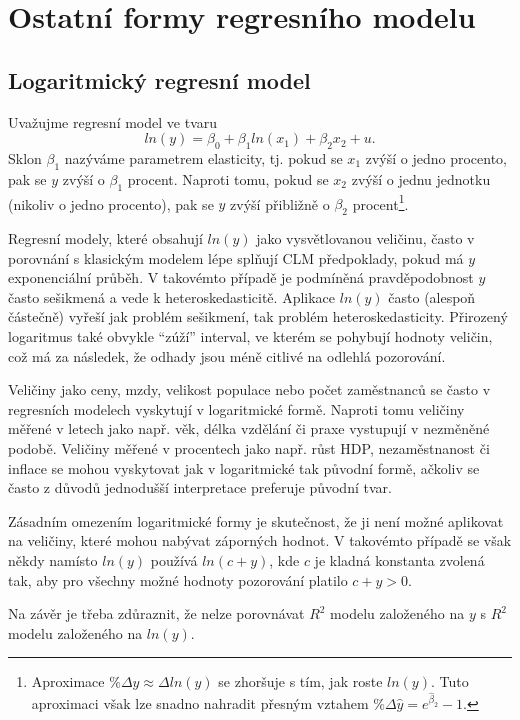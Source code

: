 \section{Ostatní formy regresního modelu}

\subsection{Logaritmický regresní model}

Uvažujme regresní model ve tvaru
\begin{equation}
ln(y) = \beta_0 + \beta_1 ln(x_1) + \beta_2 x_2 + u.
\end{equation}
Sklon $\beta_1$ nazýváme parametrem elasticity, tj. pokud se $x_1$ zvýší o jedno procento, pak se $y$ zvýší o $\beta_1$ procent. Naproti 
tomu, pokud se $x_2$ zvýší o jednu jednotku (nikoliv o jedno procento), pak se $y$ zvýší přibližně o $\beta_2$ procent\footnote{Aproximace 
$\%\Delta y \approx \Delta ln(y)$ se zhoršuje s tím, jak roste $ln(y)$. Tuto aproximaci však lze snadno nahradit přesným vztahem $\% \Delta 
\hat{y} = e^{\hat{\beta}_2} - 1$.}.

Regresní modely, které obsahují $ln(y)$ jako vysvětlovanou veličinu, často v porovnání s klasickým modelem lépe splňují CLM předpoklady, 
pokud má $y$ exponenciální průběh. V takovémto případě je podmíněná pravděpodobnost $y$ často sešikmená a vede k heteroskedasticitě. 
Aplikace $ln(y)$ často (alespoň částečně) vyřeší jak problém sešikmení, tak problém heteroskedasticity. Přirozený logaritmus také 
obvykle ``zúží'' interval, ve kterém se pohybují hodnoty veličin, což má za následek, že odhady jsou méně citlivé na odlehlá pozorování.

Veličiny jako ceny, mzdy, velikost populace nebo počet zaměstnanců se často v regresních modelech vyskytují v logaritmické formě. Naproti 
tomu veličiny měřené v letech jako např. věk, délka vzdělání či praxe vystupují v nezměněné podobě. Veličiny měřené v procentech 
jako např. růst HDP, nezaměstnanost či inflace se mohou vyskytovat jak v logaritmické tak původní formě, ačkoliv se často z důvodů 
jednodušší interpretace preferuje původní tvar.

Zásadním omezením logaritmické formy je skutečnost, že ji není možné aplikovat na veličiny, které mohou nabývat záporných hodnot. V 
takovémto případě se však někdy namísto $ln(y)$ používá $ln(c + y)$, kde $c$ je kladná konstanta zvolená tak, aby pro všechny možné 
hodnoty pozorování platilo $c + y > 0$.

Na závěr je třeba zdůraznit, že nelze porovnávat $R^2$ modelu založeného na $y$ s $R^2$ modelu založeného na $ln(y)$.

